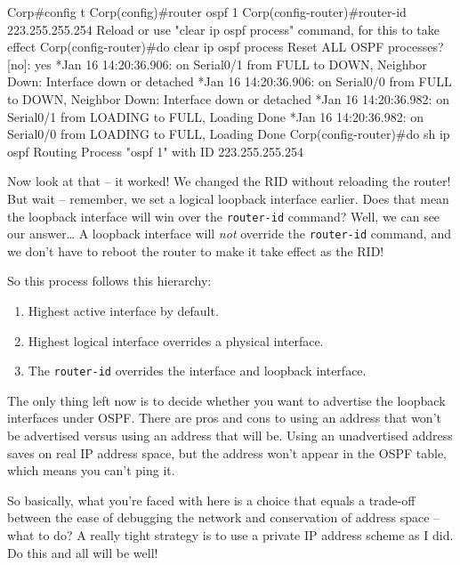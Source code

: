 \begin{cli}
Corp#config t
Corp(config)#router ospf 1
Corp(config-router)#router-id 223.255.255.254
Reload or use "clear ip ospf process" command, for this to take effect
Corp(config-router)#do clear ip ospf process
Reset ALL OSPF processes? [no]: yes
*Jan 16 14:20:36.906: %
on Serial0/1 from FULL to DOWN, Neighbor Down: Interface down
or detached
*Jan 16 14:20:36.906: %
on Serial0/0 from FULL to DOWN, Neighbor Down: Interface down
or detached
*Jan 16 14:20:36.982: %
on Serial0/1 from LOADING to FULL, Loading Done
*Jan 16 14:20:36.982: %
on Serial0/0 from LOADING to FULL, Loading Done
Corp(config-router)#do sh ip ospf
 Routing Process "ospf 1" with ID 223.255.255.254
\end{cli}

\protect\hypertarget{c18.xhtmlux5cux23Page_765}{}{}Now look at that -- it
worked! We changed the RID without reloading the router! But
wait -- remember, we set a logical loopback interface earlier. Does that
mean the loopback interface will win over the \texttt{router-id}
command? Well, we can see our answer\ldots{} A loopback interface will
\emph{not} override the \texttt{router-id} command, and we don't have to
reboot the router to make it take effect as the RID!

So this process follows this hierarchy:

\begin{enumerate}
\item
  Highest active interface by default.
\item
  Highest logical interface overrides a physical interface.
\item
  The \texttt{router-id} overrides the interface and loopback interface.
\end{enumerate}

The only thing left now is to decide whether you want to advertise the
loopback interfaces under OSPF. There are pros and cons to using an
address that won't be advertised versus using an address that will be.
Using an unadvertised address saves on real IP address space, but the
address won't appear in the OSPF table, which means you can't ping it.

So basically, what you're faced with here is a choice that equals a
trade-off between the ease of debugging the network and conservation of
address space -- what to do? A really tight strategy is to use a private
IP address scheme as I did. Do this and all will be well!


